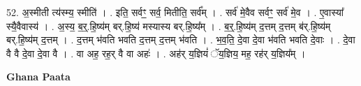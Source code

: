 \documentclass[17pt]{extarticle}
\begin{document}
52. अ॒स्मीती त्य॑स्म्य॒ स्मीति॑ । . इति॒ सर्वꣳ॒॒ सर्व॒ मितीति॒ सर्व᳚म् । . सर्व॑ मे॒वैव सर्वꣳ॒॒ सर्व॑ मे॒व । . ए॒वास्या᳚ स्यै॒वैवास्य॑ । . अ॒स्य॒ ब॒र्॒.हि॒ष्य॑म् बर्.हि॒ष्य॑ मस्यास्य बर्.हि॒ष्य᳚म् । . ब॒र्॒.हि॒ष्य॑म् द॒त्तम् द॒त्तम् ब॑र्.हि॒ष्य॑म् बर्.हि॒ष्य॑म् द॒त्तम् । . द॒त्तम् भ॑वति भवति द॒त्तम् द॒त्तम् भ॑वति । . भ॒व॒ति॒ दे॒वा दे॒वा भ॑वति भवति दे॒वाः । . दे॒वा वै वै दे॒वा दे॒वा वै । . वा अह॒ रह॒र् वै वा अहः॑ । . अह॑र् य॒ज्ञियं॑ ॅय॒ज्ञिय॒ मह॒ रह॑र् य॒ज्ञिय᳚म् । \newline

\textbf{Ghana Paata } \newline
\end{document}
